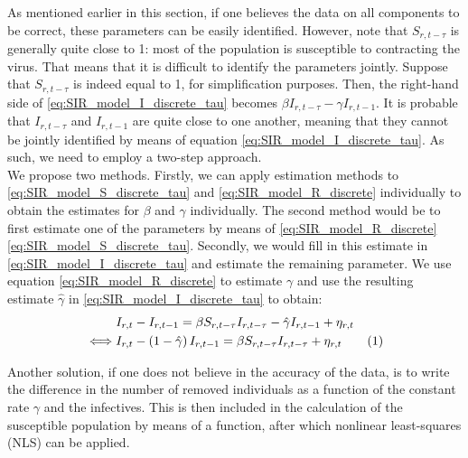 \documentclass[12pt]{article}
\newcommand\numberthis{\addtocounter{equation}{1}\tag{\theequation}}
\begin{document}
	As mentioned earlier in this section, if one believes the data on all components to be correct, these parameters can be easily identified. However, note that $S_{r,t-\tau}$ is generally quite close to 1: most of the population is susceptible to contracting the virus. That means that it is difficult to identify the parameters jointly. Suppose that $S_{r,t-\tau}$ is indeed equal to 1, for simplification purposes. Then, the right-hand side of \eqref{eq:SIR_model_I_discrete_tau} becomes $\beta I_{r,t-\tau} - \gamma I_{r,t-1}$. It is probable that $I_{r,t-\tau}$ and $I_{r,t-1}$ are quite close to one another, meaning that they cannot be jointly identified by means of equation \eqref{eq:SIR_model_I_discrete_tau}. As such, we need to employ a two-step approach. \\
	
	We propose two methods. Firstly, we can apply estimation methods to \eqref{eq:SIR_model_S_discrete_tau} and \eqref{eq:SIR_model_R_discrete} individually to obtain the estimates for $\beta$ and $\gamma$ individually. The second method would be to first estimate one of the parameters by means of \eqref{eq:SIR_model_R_discrete} \eqref{eq:SIR_model_S_discrete_tau}. Secondly, we would fill in this estimate in \eqref{eq:SIR_model_I_discrete_tau} and estimate the remaining parameter. We use equation \ref{eq:SIR_model_R_discrete} to estimate $\gamma$ and use the resulting estimate $\hat{\gamma}$ in \eqref{eq:SIR_model_I_discrete_tau} to obtain:
	    \begin{align*}
	        & I_{r,t} - I_{r,t-1} = \beta S_{r,t-\tau}I_{r,t-\tau} - \hat{\gamma} I_{r,t-1} + \eta_{r,t} \\
	        \iff & I_{r,t} - \left(1 - \hat{\gamma}\right) I_{r,t-1} = \beta S_{r,t-\tau}I_{r,t-\tau} + \eta_{r,t} \numberthis{\label{eq:SIR_model_I_discrete_twostep}}
	    \end{align*}
	
	Another solution, if one does not believe in the accuracy of the data, is to write the difference in the number of removed individuals as a function of the constant rate $\gamma$ and the infectives. This is then included in the calculation of the susceptible population by means of a function, after which nonlinear least-squares (NLS) can be applied. 
	
\end{document}
